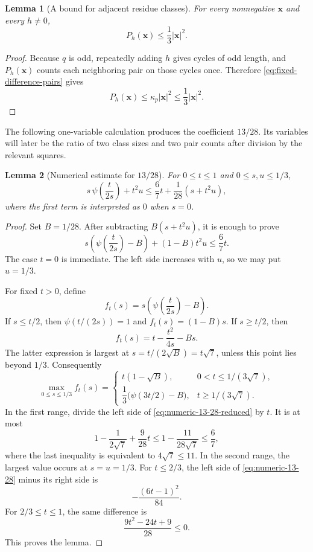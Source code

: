 \documentclass[11pt]{article}
\numberwithin{equation}{section}
\newtheorem{lemma}[lemma]{Lemma}
\theoremstyle{remark}
\begin{document}
\begin{lemma}[A bound for adjacent residue classes]
\label{lem:adjacent-pair-bound}
For every nonnegative $\mathbf x$ and every $h\ne0$,
\begin{equation}\label{eq:adjacent-pair-bound}
 P_h(\mathbf x)\le \frac13|\mathbf x|^2.
\end{equation}
\end{lemma}
\begin{proof}
Because $q$ is odd, repeatedly adding $h$ gives cycles of odd length, and
$P_h(\mathbf x)$ counts each neighboring pair on those cycles once.
Therefore \eqref{eq:fixed-difference-pairs} gives
\[
 P_h(\mathbf x)\le\kappa_p|\mathbf x|^2\le\frac13|\mathbf x|^2.
\]
\end{proof}

The following one-variable calculation produces the coefficient $13/28$.
Its variables will later be the ratio of two class sizes and two pair counts
after division by the relevant squares.
\begin{lemma}[Numerical estimate for $13/28$]\label{lem:numeric-13-28}
For $0\le t\le1$ and $0\le s,u\le1/3$,
\begin{equation}\label{eq:numeric-13-28}
 s\,\psi\left(\frac{t}{2s}\right)+t^2u
 \le \frac67t+\frac1{28}(s+t^2u),
\end{equation}
where the first term is interpreted as $0$ when $s=0$.
\end{lemma}
\begin{proof}
Set $B=1/28$.  After subtracting $B(s+t^2u)$, it is enough to prove
\begin{equation}\label{eq:numeric-13-28-reduced}
 s\left(\psi\left(\frac{t}{2s}\right)-B\right)
 +(1-B)t^2u\le\frac67t.
\end{equation}
The case $t=0$ is immediate.  The left side increases with $u$, so we may
put $u=1/3$.

For fixed $t>0$, define
\[
 f_t(s)=s\left(\psi\left(\frac{t}{2s}\right)-B\right).
\]
If $s\le t/2$, then $\psi(t/(2s))=1$ and
$f_t(s)=(1-B)s$.  If $s\ge t/2$, then
\[
 f_t(s)=t-\frac{t^2}{4s}-Bs.
\]
The latter expression is largest at
$s=t/(2\sqrt B)=t\sqrt7$, unless this point lies beyond $1/3$.
Consequently
\[
 \max_{0\le s\le1/3}f_t(s)=
 \begin{cases}
 t(1-\sqrt B),&0<t\le1/(3\sqrt7),\\[1mm]
 \dfrac13\bigl(\psi(3t/2)-B\bigr),&t\ge1/(3\sqrt7).
 \end{cases}
\]
In the first range, divide the left side of
\eqref{eq:numeric-13-28-reduced} by $t$.  It is at most
\[
 1-\frac1{2\sqrt7}+\frac9{28}t
 \le1-\frac{11}{28\sqrt7}
 \le\frac67,
\]
where the last inequality is equivalent to $4\sqrt7\le11$.
In the second range, the largest value occurs at $s=u=1/3$.  For
$t\le2/3$, the left side of \eqref{eq:numeric-13-28} minus its right side is
\[
 -\frac{(6t-1)^2}{84}.
\]
For $2/3\le t\le1$, the same difference is
\[
 \frac{9t^2-24t+9}{28}\le0.
\]
This proves the lemma.
\end{proof}
\end{document}
